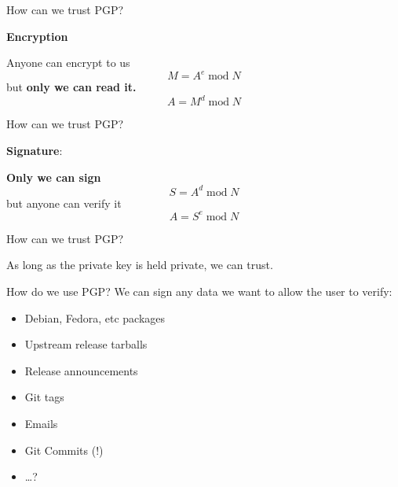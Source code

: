 \documentclass{beamer}
\begin{document}
\begin{frame}{How can we trust PGP?}
  \begin{center}
    \textbf{Encryption}
  \end{center}

  Anyone can encrypt to us
  \begin{equation*}
    M=A^e\operatorname{mod}N
  \end{equation*}
  but \textbf{only we can read it.}
  \begin{equation*}
    A=M^d\operatorname{mod}N
  \end{equation*}
\end{frame}

\begin{frame}{How can we trust PGP?}
  \begin{center}
    \textbf{Signature}:
  \end{center}

  \textbf{Only we can sign}
  \begin{equation*}
    S=A^d\operatorname{mod}N
  \end{equation*}
  but anyone can verify it
  \begin{equation*}
    A=S^e\operatorname{mod}N
  \end{equation*}
\end{frame}

\begin{frame}{How can we trust PGP?}
  \begin{center}
    \Large As long as the private key is held private, we can trust.
  \end{center}
\end{frame}

\begin{frame}{How do we use PGP?}
  We can sign any data we want to allow the user to verify:
  \begin{itemize}
  \item Debian, Fedora, etc packages
  \item Upstream release tarballs
  \item Release announcements
  \item Git tags
  \item Emails
  \item Git Commits (!)
  \item\dots?
  \end{itemize}
\end{frame}
\end{document}
